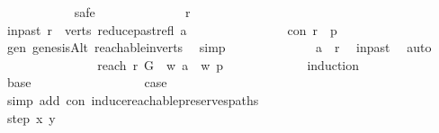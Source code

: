 \begin{isabellebody}
\ \ \ \ \ \ \ \ \ \ \isamarkupfalse%
\ safe\isanewline
\ \ \ \ \ \ \ \ \ \ \ \ \isamarkupfalse%
\ r\isanewline
\ \ \ \ \ \ \ \ \ \ \ \ \isamarkupfalse%
\ in{\isacharunderscore}{\kern0pt}past{\isacharcolon}{\kern0pt}\ {\isachardoublequoteopen}r\ {\isasymin}\ verts\ {\isacharparenleft}{\kern0pt}reduce{\isacharunderscore}{\kern0pt}past{\isacharunderscore}{\kern0pt}refl\ a{\isacharparenright}{\kern0pt}{\isachardoublequoteclose}\isanewline
\ \ \ \ \ \ \ \ \ \ \ \ \isamarkupfalse%
\ \isamarkupfalse%
\ con{\isacharcolon}{\kern0pt}\ {\isachardoublequoteopen}r\ {\isasymrightarrow}\isactrlsup {\isacharasterisk}{\kern0pt}\ p{\isachardoublequoteclose}\ \isamarkupfalse%
\ gen\ genesisAlt\ reachable{\isacharunderscore}{\kern0pt}in{\isacharunderscore}{\kern0pt}verts\ \isamarkupfalse%
\ simp\isanewline
\ \ \ \ \ \ \ \ \ \ \ \ \isamarkupfalse%
\ {\isachardoublequoteopen}a\ {\isasymrightarrow}\isactrlsup {\isacharasterisk}{\kern0pt}\ r{\isachardoublequoteclose}\ \isamarkupfalse%
\ in{\isacharunderscore}{\kern0pt}past\ \isamarkupfalse%
\ auto\isanewline
\ \ \ \ \ \ \ \ \ \ \ \ \isamarkupfalse%
\ \isamarkupfalse%
\ reach{\isacharcolon}{\kern0pt}\ {\isachardoublequoteopen}r\ {\isasymrightarrow}\isactrlsup {\isacharasterisk}{\kern0pt}\isactrlbsub G\ {\isasymrestriction}\ {\isacharbraceleft}{\kern0pt}w{\isachardot}{\kern0pt}\ a\ {\isasymrightarrow}\isactrlsup {\isacharasterisk}{\kern0pt}\ w{\isacharbraceright}{\kern0pt}\isactrlesub \ p{\isachardoublequoteclose}\isanewline
\ \ \ \ \ \ \ \ \ \ \ \ \isamarkupfalse%
{\isacharparenleft}{\kern0pt}induction{\isacharparenright}{\kern0pt}\isanewline
\ \ \ \ \ \ \ \ \ \ \ \ \ \ \isamarkupfalse%
\ base\isanewline
\ \ \ \ \ \ \ \ \ \ \ \ \ \ \isamarkupfalse%
\ \isamarkupfalse%
\ {\isacharquery}{\kern0pt}case\isanewline
\ \ \ \ \ \ \ \ \ \ \ \ \ \ \ \ \isamarkupfalse%
\ {\isacharparenleft}{\kern0pt}simp\ add{\isacharcolon}{\kern0pt}\ con\ induce{\isacharunderscore}{\kern0pt}reachable{\isacharunderscore}{\kern0pt}preserves{\isacharunderscore}{\kern0pt}paths{\isacharparenright}{\kern0pt}\ \isanewline
\ \ \ \ \ \ \ \ \ \ \ \ \isamarkupfalse%
\isanewline
\ \ \ \ \ \ \ \ \ \ \ \ \ \ \isamarkupfalse%
\ {\isacharparenleft}{\kern0pt}step\ x\ y{\isacharparenright}{\kern0pt}\isanewline
\ \ \ \ \ \ \ \ \ \ \ \ \ \ \isamarkupfalse%

\end{isabellebody}
